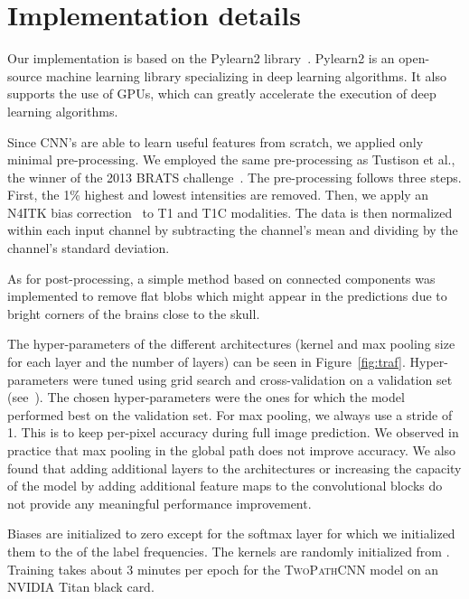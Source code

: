 \documentclass[final,5p,times,twocolumn]{elsarticle}
\begin{document}
\section{Implementation details}

\label{sec:implementation}



Our implementation is based on the Pylearn2 library~\citep{pylearn2_arxiv_2013}. Pylearn2 is an open-source machine learning library specializing in deep learning algorithms. It also supports the use of GPUs, which can greatly accelerate the execution of deep learning algorithms.



Since CNN's are able to learn useful features from scratch, we applied only minimal pre-processing. We  employed the same pre-processing as Tustison et al., the winner of the 2013 BRATS challenge~\citep{Menze2014}. The pre-processing follows three steps. First, the 1\% highest and lowest intensities are removed. Then, we apply an N4ITK bias correction~\citep{avants2009advanced} to T1 and T1C modalities. 
The data is then normalized within each input channel by subtracting the channel's mean and dividing by the channel's standard deviation.

As for post-processing, a simple method based on connected components was implemented to remove flat blobs which might appear in the predictions due to bright corners of the brains close to the skull.


The hyper-parameters of the different architectures (kernel and max pooling size for each layer and the number of layers) can be seen in Figure~\ref{fig:traf}. Hyper-parameters were tuned using grid search and cross-validation on a validation set (see~\citet{bengio2012}). The chosen hyper-parameters were the ones for which the model performed best on the validation set. For max pooling, we always use a stride of 1. This is to keep per-pixel accuracy during full image prediction. We observed in practice that max pooling in the global path does not improve accuracy.  We also found that adding additional layers to the architectures or increasing the capacity of the model by adding additional feature maps to the convolutional blocks do not provide any meaningful performance improvement. 

Biases are initialized to zero except for the softmax layer for which we initialized them to the  of the label frequencies. The kernels are randomly initialized from .
Training takes about 3 minutes per epoch for the \textsc{TwoPathCNN} model on an NVIDIA Titan black card.
\end{document}
